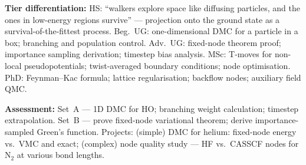 \documentclass[11pt,a4paper]{article}
\begin{document}
\begin{tcolorbox}[modulebox, title={Module~II.1 / L06: Quantum Monte Carlo II --- Diffusion QMC}]
\medskip\textbf{Tier differentiation:}
HS: ``walkers explore space like diffusing particles, and the ones in low-energy regions
survive'' --- projection onto the ground state as a survival-of-the-fittest process.
Beg.\ UG: one-dimensional DMC for a particle in a box; branching and population control.
Adv.\ UG: fixed-node theorem proof; importance sampling derivation; timestep bias analysis.
MSc: T-moves for non-local pseudopotentials; twist-averaged boundary conditions; node optimisation.
PhD: Feynman--Kac formula; lattice regularisation; backflow nodes; auxiliary field QMC.

\medskip\textbf{Assessment:}
Set~A --- 1D DMC for HO; branching weight calculation; timestep extrapolation.
Set~B --- prove fixed-node variational theorem; derive importance-sampled Green's function.
Projects: (simple) DMC for helium: fixed-node energy vs.\ VMC and exact;
(complex) node quality study --- HF vs.\ CASSCF nodes for N$_2$ at various bond lengths.
\end{tcolorbox}

\medskip
\end{document}
